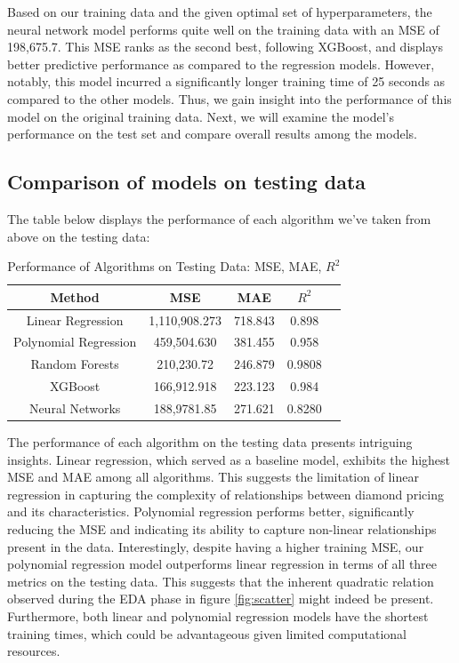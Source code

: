 \documentclass[conference]{IEEEtran}
\begin{document}
Based on our training data and the given optimal set of hyperparameters, the neural network model performs quite well on the training data with an MSE of 198,675.7. This MSE ranks as the second best, following XGBoost, and displays better predictive performance as compared to the regression models. However, notably, this model incurred a significantly longer training time of 25 seconds as compared to the other models. Thus, we gain insight into the performance of this model on the original training data. Next, we will examine the model's performance on the test set and compare overall results among the models.

\subsection{Comparison of models on testing data}

The table below displays the performance of each algorithm we've taken from above on the testing data:

\begin{table}[H]
\centering
\caption{Performance of Algorithms on Testing Data: MSE, MAE, $R^2$}
\begin{tabular}{|c|c|c|c|c|}
\hline
Method & MSE & MAE & $R^2$ \\
\hline
Linear Regression & 1,110,908.273 & 718.843 & 0.898 \\
\hline
Polynomial Regression & 459,504.630 & 381.455 &  0.958 \\
\hline
Random Forests & 210,230.72 & 246.879 & 0.9808  \\
\hline
XGBoost & 166,912.918 & 223.123 & 0.984 \\
\hline
Neural Networks & 188,9781.85 & 271.621 & 0.8280 \\
\hline
\end{tabular}
\label{tab:mytable}
\end{table}

The performance of each algorithm on the testing data presents intriguing insights. Linear regression, which served as a baseline model, exhibits the highest MSE and MAE among all algorithms. This suggests the limitation of linear regression in capturing the complexity of relationships between diamond pricing and its characteristics. Polynomial regression performs better, significantly reducing the MSE and indicating its ability to capture non-linear relationships present in the data. Interestingly, despite having a higher training MSE, our polynomial regression model outperforms linear regression in terms of all three metrics on the testing data. This suggests that the inherent quadratic relation observed during the EDA phase in figure \ref{fig:scatter} might indeed be present. Furthermore, both linear and polynomial regression models have the shortest training times, which could be advantageous given limited computational resources.
\end{document}
